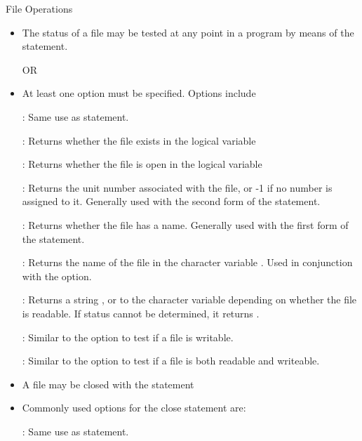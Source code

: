 \documentclass[10pt,t]{beamer}
\begin{document}
\begin{frame}{File Operations}
\begin{itemize}
      \framebreak
    \item The status of a file may be tested at any point in a program by means of the  statement.
    \item[] 
    \item[OR]
    \item[] 
    \item At least one option must be specified. Options include
    \item[] : Same use as  statement.
    \item[] : Returns whether the file exists in the logical variable 
    \item[] : Returns whether the file is open in the logical variable 
    \item[] : Returns the unit number associated with the file, or -1 if no number is assigned to it. Generally used with the second form of the  statement.
    \item[] : Returns whether the file has a name. Generally used with the first form of the  statement.
    \item[] : Returns the name of the file in the character variable . Used in conjunction with the  option.
    \item[] : Returns a string , or  to the character variable  depending on whether the file is readable. If status cannot be determined, it returns .
    \item[] : Similar to the  option to test if a file is writable.
    \item[] : Similar to the  option to test if a file is both readable and writeable.
      \framebreak
    \item A file may be closed with the statement
    \item[]
    \item Commonly used options for the close statement are:
    \item[] : Same use as  statement.

\end{itemize}
\end{frame}
\end{document}
